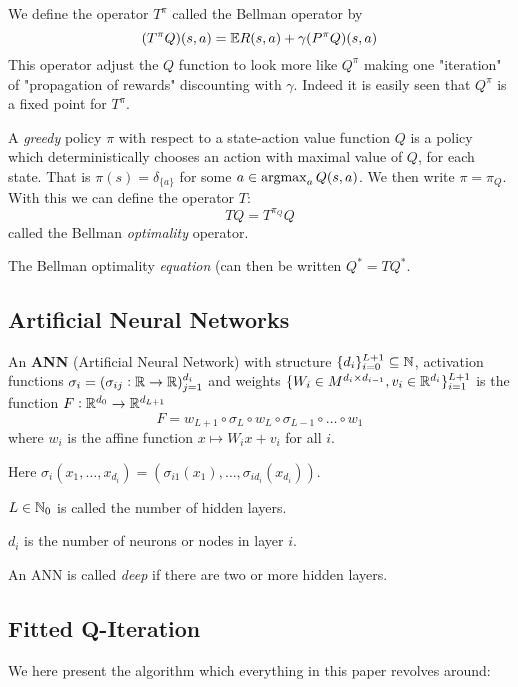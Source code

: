 We define the operator $T^\pi$ called the Bellman operator by
\[ (T^\pi Q)(s, a) = \mathbb{E} R(s, a) + \gamma (P^\pi Q)(s, a) \]
This operator adjust the $Q$ function to look more like $Q^\pi$ making one
"iteration" of "propagation of rewards" discounting with $\gamma$.
Indeed it is easily seen that $Q^\pi$ is a fixed point for $T^\pi$.

A \emph{greedy} policy $\pi$ with respect to a state-action value function
$Q$ is a policy which deterministically chooses an action with maximal value of $Q$,
for each state. That is $\pi(s) = \delta_{\{a\}}$ for some $a \in \operatorname*{argmax}_a Q(s,a)$.
We then write $\pi = \pi_Q$. With this we can define the operator $T$:
\[ T Q = T^{\pi_Q} Q \]
called the Bellman \emph{optimality} operator.

The Bellman optimality \emph{equation} (can then be written $Q^* = TQ^*$.

\subsection{Artificial Neural Networks}

\begin{defn}\label{def_ANN}
	An \textbf{ANN} (Artificial Neural Network) with structure
	$\{ d_i \}_{i=0}^{L+1} \subseteq \mathbb{N}$,
	activation functions $\sigma_i = (\sigma_{ij} : \mathbb{R} \to \mathbb{R})_{j=1}^{d_i}$
	and weights $\{ W_i \in M^{d_i \times d_{i-1}}, v_i \in \mathbb{R}^{d_i} \}_{i=1}^{L+1}$
	is the function $F:\mathbb{R}^{d_0} \to \mathbb{R}^{d_{L+1}}$ 
	\[ F = w_{L+1} \circ \sigma_L \circ w_L \circ \sigma_{L-1} \circ \dots \circ w_1 \]
	where $w_i$ is the affine function $x \mapsto W_i x + v_i$ for all $i$.

	Here $\sigma_i(x_1, \dots, x_{d_i})
	= (\sigma_{i1}(x_1), \dots, \sigma_{id_{i}}(x_{d_{i}}))$.

	$L \in \mathbb{N}_0$ is called the number of hidden layers.

	$d_i$ is the number of neurons or nodes in layer $i$.
\end{defn}

An ANN is called \emph{deep} if there are two or more hidden layers.

\subsection{Fitted Q-Iteration}

We here present the algorithm which everything in this paper revolves around:

